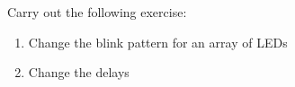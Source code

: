 




\begin{exercise}
Carry out the following exercise:
\begin{enumerate}
\item Change the blink pattern for an array of LEDs
\item Change the delays
\end{enumerate}
\end{exercise}

